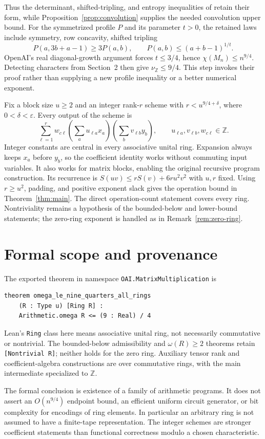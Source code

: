 \documentclass[11pt]{article}
\theoremstyle{remark}
\newcommand{\Z}{\mathbb Z}
\newcommand{\eps}{\varepsilon}
\numberwithin{equation}{section}
\begin{document}
Thus the determinant, shifted-tripling, and entropy inequalities of
\cite{OAI} retain their form, while Proposition~\ref{prop:convolution}
supplies the needed convolution upper bound. For the symmetrized profile
$P$ and its parameter $t>0$, the retained laws include symmetry,
row concavity, shifted tripling
\[
 P(a,3b+a-1)\geq3P(a,b),
 \qquad P(a,b)\leq(a+b-1)^{1/t}.
\]
OpenAI's real diagonal-growth argument forces $t\leq3/4$, hence
$\chi(M_n)\leq n^{9/4}$. Detecting characters from Section~2 then give
$\nu_\Z\leq9/4$. This step invokes their proof rather than supplying a
new profile inequality or a better numerical exponent.

Fix a block size $u\geq2$ and an integer rank-$r$ scheme with
$r<u^{9/4+\delta}$, where $0<\delta<\eps$. Every output of the scheme is
\[
 \sum_{\ell=1}^r w_{c\ell}
 \left(\sum_a u_{\ell a}x_a\right)
 \left(\sum_b v_{\ell b}y_b\right),
 \qquad u_{\ell a},v_{\ell b},w_{c\ell}\in\Z.
\]
Integer constants are central in every associative unital ring.
Expansion always keeps $x_a$ before $y_b$, so the coefficient identity
works without commuting input variables. It also works for matrix
blocks, enabling the original recursive program construction.
Its recurrence is $S(uv)\leq rS(v)+6ru^2v^2$ with $u,r$ fixed.
Using $r\geq u^2$, padding, and positive exponent slack gives the
operation bound in Theorem~\ref{thm:main}. The direct operation-count
statement covers every ring. Nontriviality remains a hypothesis of the
bounded-below and lower-bound statements; the zero-ring exponent is handled
as in Remark~\ref{rem:zero-ring}.

\section{Formal scope and provenance}

The exported theorem in namespace
\texttt{OAI.MatrixMultiplication} is
\begin{verbatim}
theorem omega_le_nine_quarters_all_rings
    (R : Type u) [Ring R] :
    Arithmetic.omega R <= (9 : Real) / 4
\end{verbatim}
Lean's \texttt{Ring} class here means associative unital ring, not
necessarily commutative or nontrivial. The bounded-below admissibility and
$\omega(R)\geq2$ theorems retain \texttt{[Nontrivial R]}; neither holds
for the zero ring. Auxiliary tensor rank and coefficient-algebra
constructions are over commutative rings, with the main intermediate
specialized to $\Z$.

The formal conclusion is existence of a family of arithmetic programs.
It does not assert an $O(n^{9/4})$ endpoint bound, an efficient uniform
circuit generator, or bit complexity for encodings of ring elements.
In particular an arbitrary ring is not assumed to have a finite-tape
representation. The integer schemes are stronger coefficient statements
than functional correctness modulo a chosen characteristic.
\end{document}
